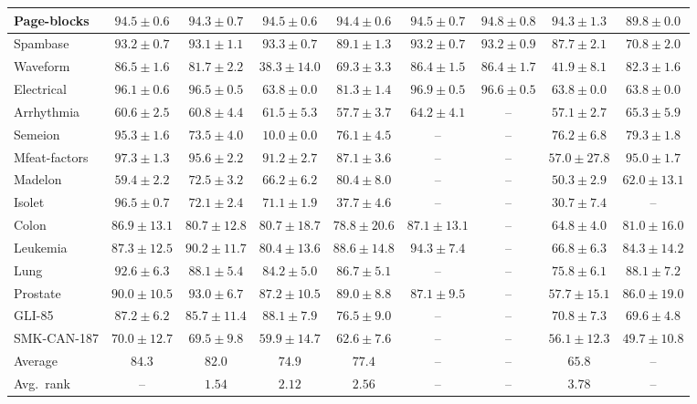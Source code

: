 \begin{minipage}{\linewidth}
{\begin{tabular}{@{}l*{8}{c}@{}}
Page-blocks & $94.5 \pm 0.6$ & $94.3 \pm 0.7$ & $94.5 \pm 0.6$ & $94.4 \pm 0.6$ & $94.5 \pm 0.7$ & $\mathbf{94.8} \pm 0.8$ & $94.3 \pm 1.3$ & $89.8 \pm 0.0$ \\
\midrule
Spambase & $93.2 \pm 0.7$ & $93.1 \pm 1.1$ & $\mathbf{93.3} \pm 0.7$ & $89.1 \pm 1.3$ & $93.2 \pm 0.7$ & $93.2 \pm 0.9$ & $87.7 \pm 2.1$ & $70.8 \pm 2.0$ \\
Waveform & $86.5 \pm 1.6$ & $81.7 \pm 2.2$ & $38.3 \pm 14.0$ & $69.3 \pm 3.3$ & $\mathbf{86.4} \pm 1.5$ & $\mathbf{86.4} \pm 1.7$ & $41.9 \pm 8.1$ & $82.3 \pm 1.6$ \\
Electrical & $96.1 \pm 0.6$ & $96.5 \pm 0.5$ & $63.8 \pm 0.0$ & $81.3 \pm 1.4$ & $\mathbf{96.9} \pm 0.5$ & $96.6 \pm 0.5$ & $63.8 \pm 0.0$ & $63.8 \pm 0.0$ \\
\midrule
Arrhythmia & $60.6 \pm 2.5$ & $60.8 \pm 4.4$ & $61.5 \pm 5.3$ & $57.7 \pm 3.7$ & $64.2 \pm 4.1$ & -- & $57.1 \pm 2.7$ & $\mathbf{65.3} \pm 5.9$ \\
Semeion & $95.3 \pm 1.6$ & $73.5 \pm 4.0$ & $10.0 \pm 0.0$ & $76.1 \pm 4.5$ & -- & -- & $76.2 \pm 6.8$ & $\mathbf{79.3} \pm 1.8$ \\
Mfeat-factors & $97.3 \pm 1.3$ & $\mathbf{95.6} \pm 2.2$ & $91.2 \pm 2.7$ & $87.1 \pm 3.6$ & -- & -- & $57.0 \pm 27.8$ & $95.0 \pm 1.7$ \\
Madelon & $59.4 \pm 2.2$ & $72.5 \pm 3.2$ & $66.2 \pm 6.2$ & $\mathbf{80.4} \pm 8.0$ & -- & -- & $50.3 \pm 2.9$ & $62.0 \pm 13.1$ \\
Isolet & $96.5 \pm 0.7$ & $\mathbf{72.1} \pm 2.4$ & $71.1 \pm 1.9$ & $37.7 \pm 4.6$ & -- & -- & $30.7 \pm 7.4$ & -- \\
\midrule
Colon & $86.9 \pm 13.1$ & $80.7 \pm 12.8$ & $80.7 \pm 18.7$ & $78.8 \pm 20.6$ & $\mathbf{87.1} \pm 13.1$ & -- & $64.8 \pm 4.0$ & $81.0 \pm 16.0$ \\
Leukemia & $87.3 \pm 12.5$ & $90.2 \pm 11.7$ & $80.4 \pm 13.6$ & $88.6 \pm 14.8$ & $\mathbf{94.3} \pm 7.4$ & -- & $66.8 \pm 6.3$ & $84.3 \pm 14.2$ \\
Lung & $92.6 \pm 6.3$ & $\mathbf{88.1} \pm 5.4$ & $84.2 \pm 5.0$ & $86.7 \pm 5.1$ & -- & -- & $75.8 \pm 6.1$ & $\mathbf{88.1} \pm 7.2$ \\
Prostate & $90.0 \pm 10.5$ & $\mathbf{93.0} \pm 6.7$ & $87.2 \pm 10.5$ & $89.0 \pm 8.8$ & $87.1 \pm 9.5$ & -- & $57.7 \pm 15.1$ & $86.0 \pm 19.0$ \\
GLI-85 & $87.2 \pm 6.2$ & $85.7 \pm 11.4$ & $\mathbf{88.1} \pm 7.9$ & $76.5 \pm 9.0$ & -- & -- & $70.8 \pm 7.3$ & $69.6 \pm 4.8$ \\
SMK-CAN-187 & $70.0 \pm 12.7$ & $\mathbf{69.5} \pm 9.8$ & $59.9 \pm 14.7$ & $62.6 \pm 7.6$ & -- & -- & $56.1 \pm 12.3$ & $49.7 \pm 10.8$ \\
\midrule
Average & $84.3$ & $82.0$ & $74.9$ & $77.4$ & -- & -- & $65.8$ & -- \\
Avg.\ rank & -- & $1.54$ & $2.12$ & $2.56$ & -- & -- & $3.78$ & -- \\
\bottomrule
\end{tabular}%
}
\end{minipage}\par
